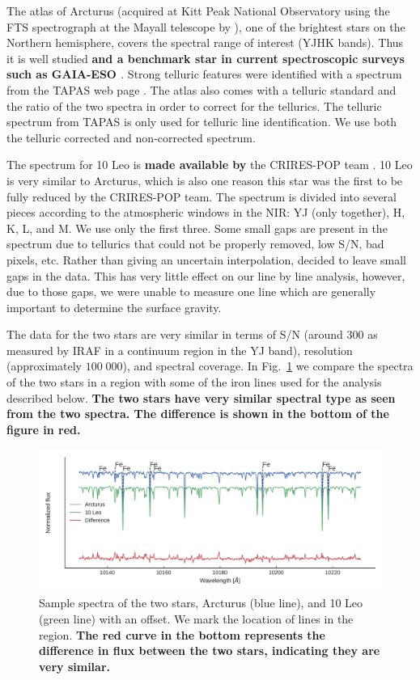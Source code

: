 \documentclass{aa}
\begin{document}
The atlas of Arcturus (acquired at Kitt Peak National Observatory using the FTS
spectrograph at the Mayall telescope by \citet{Hinkle1995a}), one of the
brightest stars on the Northern hemisphere, covers the spectral range of
interest (YJHK bands). Thus it is well studied \citep[see e.g.][to mention just
a few]{Griffin1967,McWilliam1990,Ramirez2013} {\bf and a benchmark star in
current spectroscopic surveys such as GAIA-ESO \citep{Jofre2014,Smiljanic2014}}.
Strong telluric features were identified with a spectrum from the TAPAS web page
\citep{Bertaux2014}. The atlas also comes with a telluric standard and the ratio
of the two spectra in order to correct for the tellurics. The telluric spectrum
from TAPAS is only used for telluric line identification. We use both the
telluric corrected and non-corrected spectrum.

The spectrum for 10 Leo is {\bf made available by} the CRIRES-POP team
\citep{Nicholls2017}. 10 Leo is very similar to Arcturus, which is also one
reason this star was the first to be fully reduced by the CRIRES-POP team. The
spectrum is divided into several pieces according to the atmospheric windows in
the NIR: YJ (only together), H, K, L, and M. We use only the first three. Some
small gaps are present in the spectrum due to tellurics that could not be
properly removed, low S/N, bad pixels, etc. Rather than giving an uncertain
interpolation, \citet{Nicholls2017} decided to leave small gaps in the data.
This has very little effect on our line by line analysis, however, due to those
gaps, we were unable to measure one  line which are generally
important to determine the surface gravity.

The data for the two stars are very similar in terms of S/N (around 300 as
measured by IRAF in a continuum region in the YJ band), resolution
(approximately $100\;000$), and spectral coverage. In Fig.~\ref{fig:both} we
compare the spectra of the two stars in a region with some of the iron lines
used for the analysis described below. {\bf The two stars have very similar
spectral type as seen from the two spectra. The difference is shown in the
bottom of the figure in red.}

\begin{figure}[htpb!]
    \centering
    \includegraphics[width=1.0\linewidth]{figures/bothspectra.pdf}
    \caption{Sample spectra of the two stars, Arcturus (blue line), and 10 Leo
             (green line) with an offset. We mark the location of 
             lines in the region. {\bf The red curve in the bottom represents
             the difference in flux between the two stars, indicating they are
             very similar.}}
    \label{fig:both}
\end{figure}
\end{document}
